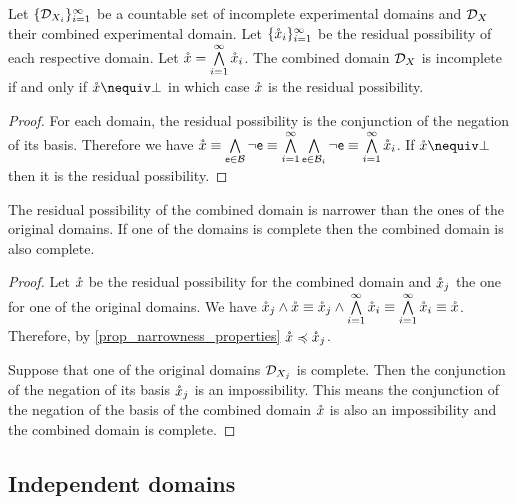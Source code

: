 \documentclass[11pt,letterpaper,fleqn]{memoir} %
\begin{document}
\begin{mathSection}
	\begin{prop}
		Let $\{\edomain_{X_i}\}_{i=1}^{\infty}$ be a countable set of incomplete experimental domains and $\edomain_X$ their combined experimental domain. Let $\{\resPoss_i\}_{i=1}^{\infty}$ be  the residual possibility of each respective domain. Let $\resPoss = \bigAND\limits_{i=1}^{\infty} \resPoss_i$. The combined domain $\edomain_X$ is incomplete if and only if $\resPoss \nequiv \impossibility$ in which case $\resPoss$ is the residual possibility.
	\end{prop}
	
	\begin{proof}
		For each domain, the residual possibility is the conjunction of the negation of its basis. Therefore we have $\resPoss \equiv \bigAND\limits_{\stmt[e] \in \basis} \NOT \stmt[e] \equiv \bigAND\limits_{i=1}^{\infty} \bigAND\limits_{\stmt[e] \in \basis_i} \NOT \stmt[e] \equiv \bigAND\limits_{i=1}^{\infty} \resPoss_i$. If $\resPoss \nequiv \impossibility$ then it is the residual possibility.
	\end{proof}
	
	\begin{coro}
		The residual possibility of the combined domain is narrower than the ones of the original domains. If one of the domains is complete then the combined domain is also complete.
	\end{coro}

	\begin{proof}
		Let $\resPoss$ be the residual possibility for the combined domain and $\resPoss_j$ the one for one of the original domains. We have $\resPoss_j \AND \resPoss \equiv \resPoss_j \AND \bigAND\limits_{i=1}^{\infty} \resPoss_i \equiv \bigAND\limits_{i=1}^{\infty} \resPoss_i \equiv \resPoss$. Therefore, by \ref{prop_narrowness_properties} $\resPoss \narrower \resPoss_j$.
		
		Suppose that one of the original domains $\edomain_{X_j}$ is complete. Then the conjunction of the negation of its basis $\resPoss_j$ is an impossibility. This means the conjunction of the negation of the basis of the combined domain $\resPoss$ is also an impossibility and the combined domain is complete.
	\end{proof}
\end{mathSection}

\subsection{Independent domains}
\end{document}
